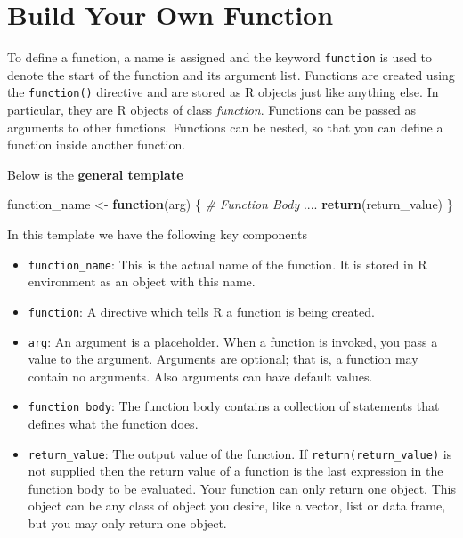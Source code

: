 \documentclass[
]{book}
\newenvironment{Shaded}{\begin{snugshade}}{\end{snugshade}}
\newcommand{\CommentTok}[1]{\textcolor[rgb]{0.56,0.35,0.01}{\textit{#1}}}
\newcommand{\ControlFlowTok}[1]{\textcolor[rgb]{0.13,0.29,0.53}{\textbf{#1}}}
\newcommand{\KeywordTok}[1]{\textcolor[rgb]{0.13,0.29,0.53}{\textbf{#1}}}
\newcommand{\NormalTok}[1]{#1}
\newcommand{\StringTok}[1]{\textcolor[rgb]{0.31,0.60,0.02}{#1}}
\providecommand{\tightlist}{%
  \setlength{\itemsep}{0pt}\setlength{\parskip}{0pt}}
\begin{document}
\hypertarget{build-your-own-function}{%
\section{Build Your Own Function}\label{build-your-own-function}}

To define a function, a name is assigned and the keyword \texttt{function} is used to denote the start of the function and its argument list. Functions are created using the \texttt{function()} directive and are stored as R objects just like anything else. In particular, they are R objects of class \emph{function}. Functions can be passed as arguments to other functions. Functions can be nested, so that you can define a function inside another function.

Below is the \textbf{general template}

\begin{Shaded}
\begin{Highlighting}[]
\NormalTok{function_name <-}\StringTok{ }\ControlFlowTok{function}\NormalTok{(arg) \{}
    \CommentTok{# Function Body}
\NormalTok{    ....}
    \KeywordTok{return}\NormalTok{(return_value)}
\NormalTok{\}}
\end{Highlighting}
\end{Shaded}

In this template we have the following key components

\begin{itemize}
\tightlist
\item
  \texttt{function\_name}: This is the actual name of the function. It is stored in R environment as an object with this name.
\item
  \texttt{function}: A directive which tells R a function is being created.
\item
  \texttt{arg}: An argument is a placeholder. When a function is invoked, you pass a value to the argument. Arguments are optional; that is, a function may contain no arguments. Also arguments can have default values.
\item
  \texttt{function\ body}: The function body contains a collection of statements that defines what the function does.
\item
  \texttt{return\_value}: The output value of the function. If \texttt{return(return\_value)} is not supplied then the return value of a function is the last expression in the function body to be evaluated. Your function can only return one object. This object can be any class of object you desire, like a vector, list or data frame, but you may only return one object.
\end{itemize}
\end{document}
